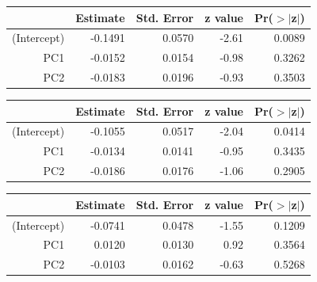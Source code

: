 \documentclass[a4paper,12pt]{Latex/Classes/PhDthesisPSnPDF}
\begin{document}
\newpage
\begin{center}
\begin{table}[ht]
\centering
\begin{tabular}{rrrrr}
  \hline
 & Estimate & Std. Error & z value & Pr($>$$|$z$|$) \\ 
  \hline
(Intercept) & -0.1491 & 0.0570 & -2.61 & 0.0089 \\ 
  PC1 & -0.0152 & 0.0154 & -0.98 & 0.3262 \\ 
  PC2 & -0.0183 & 0.0196 & -0.93 & 0.3503 \\ 
   \hline
\end{tabular}
\end{table}\end{center}
\begin{center}
\begin{table}[ht]
\centering
\begin{tabular}{rrrrr}
  \hline
 & Estimate & Std. Error & z value & Pr($>$$|$z$|$) \\ 
  \hline
(Intercept) & -0.1055 & 0.0517 & -2.04 & 0.0414 \\ 
  PC1 & -0.0134 & 0.0141 & -0.95 & 0.3435 \\ 
  PC2 & -0.0186 & 0.0176 & -1.06 & 0.2905 \\ 
   \hline
\end{tabular}
\end{table}\end{center}
\begin{center}
\begin{table}[ht]
\centering
\begin{tabular}{rrrrr}
  \hline
 & Estimate & Std. Error & z value & Pr($>$$|$z$|$) \\ 
  \hline
(Intercept) & -0.0741 & 0.0478 & -1.55 & 0.1209 \\ 
  PC1 & 0.0120 & 0.0130 & 0.92 & 0.3564 \\ 
  PC2 & -0.0103 & 0.0162 & -0.63 & 0.5268 \\ 
   \hline
\end{tabular}
\end{table}\end{center}
\end{document}
